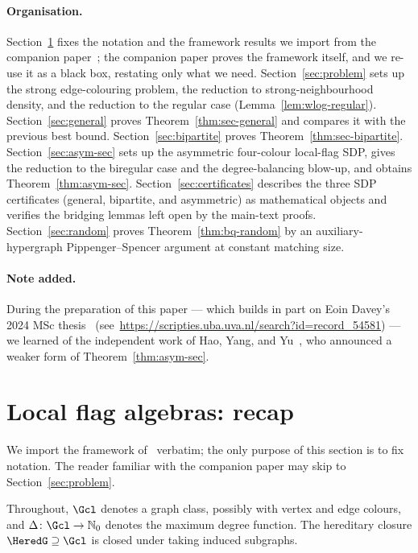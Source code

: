 \documentclass[11pt,a4paper]{article}
\theoremstyle{definition}
\theoremstyle{remark}
\begin{document}
\paragraph{Organisation.}

Section~\ref{sec:framework} fixes the notation and the framework
results we import from the companion
paper~\cite{daveyPentagonLocalFlags2026}; the companion paper proves
the framework itself, and we re-use it as a black box, restating only
what we need. Section~\ref{sec:problem} sets up the strong edge-colouring
problem, the reduction to strong-neighbourhood density, and the reduction to the regular case
(Lemma~\ref{lem:wlog-regular}). Section~\ref{sec:general} proves
Theorem~\ref{thm:sec-general} and compares it with the previous best
bound. Section~\ref{sec:bipartite} proves
Theorem~\ref{thm:sec-bipartite}. Section~\ref{sec:asym-sec} sets
up the asymmetric four-colour local-flag SDP, gives the reduction to
the biregular case and the degree-balancing blow-up, and obtains
Theorem~\ref{thm:asym-sec}.
Section~\ref{sec:certificates} describes the three SDP certificates
(general, bipartite, and asymmetric) as mathematical objects and
verifies the bridging lemmas left open by the main-text proofs.
Section~\ref{sec:random} proves Theorem~\ref{thm:bq-random} by an
auxiliary-hypergraph Pippenger--Spencer argument at constant matching
size.

\paragraph{Note added.}
During the preparation of this paper --- which builds in part on Eoin Davey's 2024 MSc thesis~\cite{daveyLocalFlags2024} (see~\url{https://scripties.uba.uva.nl/search?id=record_54581}) --- we learned of the independent work of Hao, Yang, and Yu~\cite{haoStrongChromaticIndexBipartite2026}, who announced a weaker form of Theorem~\ref{thm:asym-sec}.

\section{Local flag algebras: recap}
\label{sec:framework}

We import the framework
of~\cite{daveyPentagonLocalFlags2026} verbatim; the only purpose of
this section is to fix notation. The reader familiar with the
companion paper may skip to Section~\ref{sec:problem}.

Throughout, $\Gcl$ denotes a graph class, possibly with vertex and
edge colours, and $\Delta\colon \Gcl \to \mathbb{N}_0$ denotes the
maximum degree function. The hereditary closure
$\HeredG \supseteq \Gcl$ is closed under taking induced subgraphs.
\end{document}
